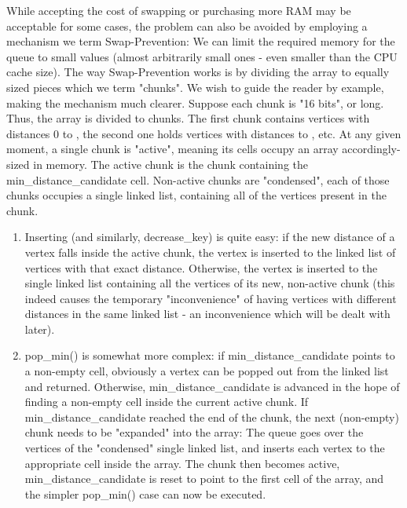 \documentclass[conference,10pt,twocolumn]{IEEEtran}
\begin{document}
While accepting the cost of swapping or purchasing more RAM may be acceptable for some cases, the problem can also be avoided by employing a mechanism we term Swap-Prevention: We can limit the required memory for the queue to small values (almost arbitrarily small ones - even smaller than the CPU cache size). The way Swap-Prevention works is by dividing the array to equally sized pieces which we term "chunks". We wish to guide the reader by example, making the mechanism much clearer. Suppose each chunk is "16 bits", or  long. Thus, the array is divided to  chunks. The first chunk contains vertices with distances 0 to , the second one holds vertices with distances  to , etc.
At any given moment, a single chunk is "active", meaning its  cells occupy an array accordingly-sized in memory. The active chunk is the chunk containing the min\_distance\_candidate cell. Non-active chunks are "condensed", each of those chunks occupies a single linked list, containing all of the vertices present in the chunk. 

\begin{enumerate}

\item Inserting (and similarly, decrease\_key) is quite easy: if the new distance of a vertex falls inside the active chunk, the vertex is inserted to the linked list of vertices with that exact distance. Otherwise, the vertex is inserted to the single linked list containing all the vertices of its new, non-active chunk (this indeed causes the temporary "inconvenience" of having vertices with different distances in the same linked list - an inconvenience which will be dealt with later).

\item pop\_min() is somewhat more complex: if min\_distance\_candidate points to a non-empty cell, obviously a vertex can be popped out from the linked list and returned. Otherwise, min\_distance\_candidate is advanced in the hope of finding a non-empty cell inside the current active chunk. If min\_distance\_candidate reached the end of the chunk, the next (non-empty) chunk needs to be "expanded" into the array: The queue goes over the vertices of the "condensed" single linked list, and inserts each vertex to the appropriate cell inside the array. The chunk then becomes active, min\_distance\_candidate is reset to point to the first cell of the array, and the simpler pop\_min() case can now be executed.

\end{enumerate}
\end{document}
